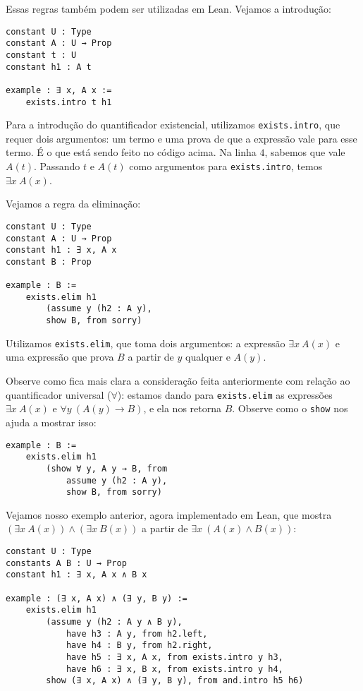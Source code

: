         Essas regras também podem ser utilizadas em Lean. Vejamos a introdução:

        \begin{lstlisting}
constant U : Type
constant A : U → Prop
constant t : U
constant h1 : A t

example : ∃ x, A x :=
    exists.intro t h1
\end{lstlisting}

        Para a introdução do quantificador existencial, utilizamos \lstinline{exists.intro}, que requer dois argumentos:
        um termo e uma prova de que a expressão vale para esse termo. É o que está sendo feito no código acima. Na linha $4$, sabemos que vale $A(t)$. Passando $t$ e $A(t)$
        como argumentos para \lstinline{exists.intro}, temos $\exists x \ A(x)$.

        Vejamos a regra da eliminação:

        \begin{lstlisting}
constant U : Type
constant A : U → Prop
constant h1 : ∃ x, A x
constant B : Prop

example : B :=
    exists.elim h1
        (assume y (h2 : A y),
        show B, from sorry)
\end{lstlisting}

        Utilizamos \lstinline{exists.elim}, que toma dois argumentos: a expressão $\exists x \ A(x)$ e uma expressão que prova $B$ a partir de $y$ qualquer e $A(y)$.
        
        Observe como fica mais clara a consideração feita anteriormente com relação ao quantificador universal ($\forall$): estamos dando para \lstinline{exists.elim} as expressões $\exists x \ A(x)$ e $\forall y \ (A(y) \to B)$, e ela nos retorna $B$. Observe como o \lstinline{show} nos ajuda a mostrar isso:

        \begin{lstlisting}
example : B :=
    exists.elim h1
        (show ∀ y, A y → B, from
            assume y (h2 : A y),
            show B, from sorry)
\end{lstlisting}

        Vejamos nosso exemplo anterior, agora implementado em Lean, que mostra $(\exists x \ A(x)) \land (\exists x \ B(x))$ a partir de $\exists x \ (A(x) \land B(x))$:
        \begin{lstlisting}
constant U : Type
constants A B : U → Prop
constant h1 : ∃ x, A x ∧ B x

example : (∃ x, A x) ∧ (∃ y, B y) :=
    exists.elim h1
        (assume y (h2 : A y ∧ B y),
            have h3 : A y, from h2.left,
            have h4 : B y, from h2.right,
            have h5 : ∃ x, A x, from exists.intro y h3,
            have h6 : ∃ x, B x, from exists.intro y h4,
        show (∃ x, A x) ∧ (∃ y, B y), from and.intro h5 h6)
\end{lstlisting}